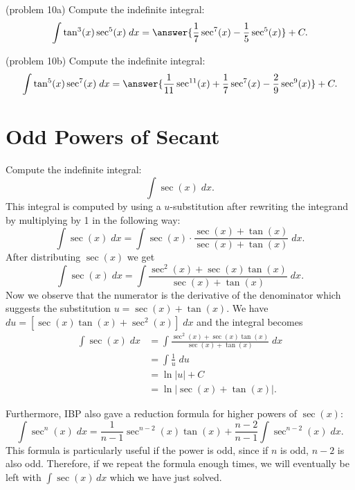 \documentclass{ximera}
\begin{document}
\begin{problem}(problem 10a)
Compute the indefinite integral:
\[
\int \tan^3(x) \sec^5(x)\;dx = \answer{\frac17 \sec^7(x) - \frac15 \sec^5(x)} + C.
\]
\end{problem}

\begin{problem}(problem 10b)
Compute the indefinite integral:
\[
\int \tan^5(x) \sec^7(x)\;dx = \answer{\frac{1}{11} \sec^{11}(x) + \frac17 \sec^7(x) -\frac29 \sec^9(x)} + C.
\]
\end{problem}





\section{Odd Powers of Secant}
\begin{example}
Compute the indefinite integral:
\[
\int \sec(x) \; dx.
\]
This integral is computed by using a $u$-substitution after rewriting the integrand
by multiplying by 1 in the following way:
\[
\int \sec(x) \; dx = \int \sec(x) \cdot \frac{\sec(x) + \tan(x)}{\sec(x) + \tan(x)} \; dx.
\]
After distributing $\sec(x)$ we get
\[
\int \sec(x) \; dx = \int \frac{\sec^2(x) + \sec(x)\tan(x)}{\sec(x) + \tan(x)} \; dx.
\]
Now we observe that the numerator is the derivative of the denominator which suggests the substitution
$u = \sec(x) + \tan(x)$. We have $du = [ \sec(x)\tan(x) + \sec^2(x)] \; dx$ and the integral becomes
\begin{align*}
\int \sec(x) \; dx &= \int \frac{\sec^2(x) + \sec(x)\tan(x)}{\sec(x) + \tan(x)} \; dx\\
&= \int \frac{1}{u} \; du\\
&= \ln|u| + C\\
&= \ln|\sec(x) + \tan(x)|.
\end{align*}

\end{example}

Furthermore, IBP also gave a reduction formula for higher powers of $\sec(x)$:
\[
\int \sec^n(x) \; dx =  \frac{1}{n-1}\sec^{n-2}(x)\tan(x) + \frac{n-2}{n-1}\int \sec^{n-2}(x) \; dx. 
\]
This formula is particularly useful if
the power is odd, since if $n$ is odd, $n-2$ is also odd.  Therefore, if we repeat the formula enough times, 
we will eventually be left with $\int \sec(x) \, dx$
which we have just solved.
\end{document}
